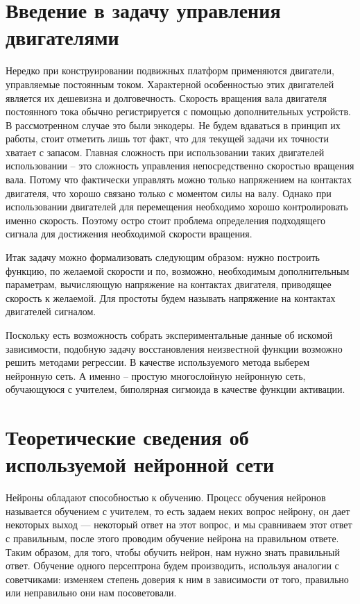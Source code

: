 \documentclass[14pt]{extreport}
\begin{document}
\newpage
    \tableofcontents

\newpage
    \chapter{Введение в задачу управления двигателями}
        Нередко при конструировании подвижных платформ применяются двигатели, управляемые постоянным током. Характерной особенностью этих двигателей является их дешевизна и долговечность. Скорость вращения вала двигателя постоянного тока обычно регистрируется с помощью дополнительных устройств. В рассмотренном случае это были энкодеры. Не будем вдаваться в принцип их работы, стоит отметить лишь тот факт, что для текущей задачи их точности хватает с запасом. Главная сложность при использовании таких двигателей использовании -- это сложность управления непосредственно скоростью вращения вала. Потому что фактически управлять можно только напряжением на контактах двигателя, что хорошо связано только с моментом силы на валу. Однако при использовании двигателей для перемещения необходимо хорошо контролировать именно скорость. Поэтому остро стоит проблема определения подходящего сигнала для достижения необходимой скорости вращения.

        Итак задачу можно формализовать следующим образом: нужно построить функцию, по желаемой скорости и по, возможно, необходимым дополнительным параметрам, вычисляющую напряжение на контактах двигателя, приводящее скорость к желаемой. Для простоты будем называть напряжение на контактах двигателей сигналом.

        Поскольку есть возможность собрать экспериментальные данные об искомой зависимости, подобную задачу восстановления неизвестной функции возможно решить методами регрессии. В качестве используемого метода выберем нейронную сеть. А именно -- простую многослойную нейронную сеть, обучающуюся с учителем, биполярная сигмоида в качестве функции активации.
\newpage
    \chapter{Теоретические сведения об используемой нейронной сети}
    Нейроны обладают способностью к обучению. Процесс обучения нейронов называется обучением с учителем, то есть задаем неких вопрос нейрону, он дает некоторых выход --- некоторый ответ на этот вопрос, и мы сравниваем этот ответ с правильным, после этого проводим обучение нейрона на правильном ответе. Таким образом, для того, чтобы обучить нейрон, нам нужно знать правильный ответ. Обучение одного персептрона будем производить, используя аналогии с советчиками: изменяем степень доверия к ним в зависимости от того, правильно или неправильно они нам посоветовали.
\end{document}
